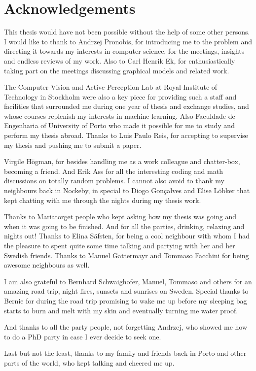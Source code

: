 \chapter*{Acknowledgements}
This thesis would have not been possible without the help of some other persons.
I would like to thank to Andrzej Pronobis, for introducing me to the problem and
directing it towards my interests in computer science, for the meetings, insights
and endless reviews of my work. Also to Carl Henrik Ek, for enthusiastically taking part
on the meetings discussing graphical models and related work.

The Computer Vision and Active Perception Lab at Royal Institute of Technology
in Stockholm were also a key piece for providing such a staff and facilities that
surrounded me during one year of thesis and exchange studies, and whose
courses replenish my interests in machine learning.
Also Faculdade de Engenharia of University of Porto who made it possible
for me to study and perform my thesis abroad.
Thanks to Luis Paulo Reis, for accepting to supervise my thesis and pushing me to submit a paper.

Virgile Högman, for besides handling me as a work colleague and chatter-box, becoming a friend.
And Erik Ass for all the interesting coding and math discussions on totally random problems.
I cannot also avoid to thank my neighbours back in Nockeby, in special to Diogo Gonçalves and Elise Löbker
that kept chatting with me through the nights during my thesis work.

Thanks to Mariatorget people who kept asking how my thesis was going and when it was going to be finished.
And for all the parties, drinking, relaxing and nights out! Thanks to Elina Säfsten, for being a cool neighbour
with whom I had the pleasure to spent quite some time talking and partying with her and her Swedish friends.
Thanks to Manuel Gattermayr and Tommaso Facchini for being awesome neighbours as well.

I am also grateful to Bernhard Schwaighofer, Manuel, Tommaso and others for an amazing
road trip, night fires, sunsets and sunrises on Sweden. Special thanks to Bernie for during the road trip
promising to wake me up before my sleeping bag starts to burn and melt with my skin and eventually turning me water proof.

And thanks to all the party people, not forgetting Andrzej, who showed me how to do a PhD party in case I ever decide
to seek one.

Last but not the least, thanks to my family and friends back in Porto and other parts of the world,
who kept talking and cheered me up.


\vspace{10mm}

